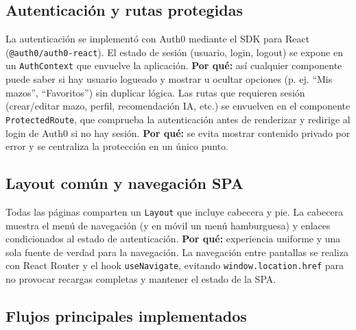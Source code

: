 \subsection{Autenticación y rutas protegidas}

La autenticación se implementó con Auth0 mediante el SDK para React (\texttt{@auth0/auth0-react}). El estado de sesión (usuario, login, logout) se expone en un \texttt{AuthContext} que envuelve la aplicación. \textbf{Por qué:} así cualquier componente puede saber si hay usuario logueado y mostrar u ocultar opciones (p. ej. ``Mis mazos'', ``Favoritos'') sin duplicar lógica. Las rutas que requieren sesión (crear/editar mazo, perfil, recomendación IA, etc.) se envuelven en el componente \texttt{ProtectedRoute}, que comprueba la autenticación antes de renderizar y redirige al login de Auth0 si no hay sesión. \textbf{Por qué:} se evita mostrar contenido privado por error y se centraliza la protección en un único punto.

\subsection{Layout común y navegación SPA}

Todas las páginas comparten un \texttt{Layout} que incluye cabecera y pie. La cabecera muestra el menú de navegación (y en móvil un menú hamburguesa) y enlaces condicionados al estado de autenticación. \textbf{Por qué:} experiencia uniforme y una sola fuente de verdad para la navegación. La navegación entre pantallas se realiza con React Router y el hook \texttt{useNavigate}, evitando \texttt{window.location.href} para no provocar recargas completas y mantener el estado de la SPA.

\subsection{Flujos principales implementados}

